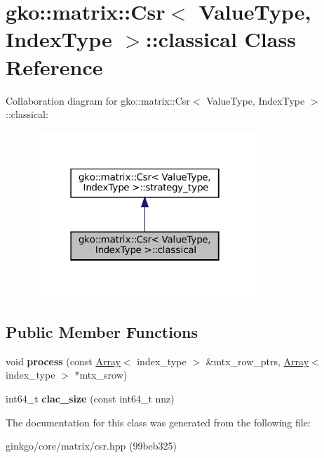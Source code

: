\hypertarget{classgko_1_1matrix_1_1Csr_1_1classical}{}\section{gko\+:\+:matrix\+:\+:Csr$<$ Value\+Type, Index\+Type $>$\+:\+:classical Class Reference}
\label{classgko_1_1matrix_1_1Csr_1_1classical}


Collaboration diagram for gko\+:\+:matrix\+:\+:Csr$<$ Value\+Type, Index\+Type $>$\+:\+:classical\+:
\nopagebreak
\begin{figure}[H]
\begin{center}
\leavevmode
\includegraphics[width=238pt]{classgko_1_1matrix_1_1Csr_1_1classical__coll__graph}
\end{center}
\end{figure}
\subsection*{Public Member Functions}
\begin{DoxyCompactItemize}
\item 
\mbox{\label{classgko_1_1matrix_1_1Csr_1_1classical_a3d2766e56763c491948818e0f3da4356}} 
void {\bfseries process} (const \hyperlink{classgko_1_1Array}{Array}$<$ index\+\_\+type $>$ \&mtx\+\_\+row\+\_\+ptrs, \hyperlink{classgko_1_1Array}{Array}$<$ index\+\_\+type $>$ $\ast$mtx\+\_\+srow)
\item 
\mbox{\label{classgko_1_1matrix_1_1Csr_1_1classical_a790b475b079d3d97de776e968f459f41}} 
int64\+\_\+t {\bfseries clac\+\_\+size} (const int64\+\_\+t nnz)
\end{DoxyCompactItemize}


The documentation for this class was generated from the following file\+:\begin{DoxyCompactItemize}
\item 
ginkgo/core/matrix/csr.\+hpp (99beb325)\end{DoxyCompactItemize}
